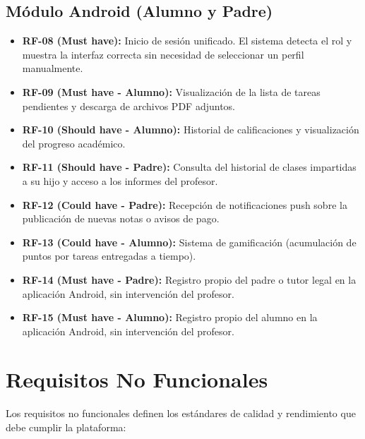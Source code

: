 \documentclass[12pt,a4paper]{report}
\begin{document}
\subsection{Módulo Android (Alumno y Padre)}
\begin{itemize}
    \item \textbf{RF-08 (Must have):} Inicio de sesión unificado. El sistema detecta el rol y muestra la interfaz correcta sin necesidad de seleccionar un perfil manualmente.
    \item \textbf{RF-09 (Must have - Alumno):} Visualización de la lista de tareas pendientes y descarga de archivos PDF adjuntos.
    \item \textbf{RF-10 (Should have - Alumno):} Historial de calificaciones y visualización del progreso académico.
    \item \textbf{RF-11 (Should have - Padre):} Consulta del historial de clases impartidas a su hijo y acceso a los informes del profesor.
    \item \textbf{RF-12 (Could have - Padre):} Recepción de notificaciones push sobre la publicación de nuevas notas o avisos de pago.
    \item \textbf{RF-13 (Could have - Alumno):} Sistema de gamificación (acumulación de puntos por tareas entregadas a tiempo).
    \item \textbf{RF-14 (Must have - Padre):} Registro propio del padre o tutor legal en la aplicación Android, sin intervención del profesor.
    \item \textbf{RF-15 (Must have - Alumno):} Registro propio del alumno en la aplicación Android, sin intervención del profesor.
\end{itemize}

\section{Requisitos No Funcionales}

Los requisitos no funcionales definen los estándares de calidad y rendimiento que debe cumplir la plataforma:
\end{document}
